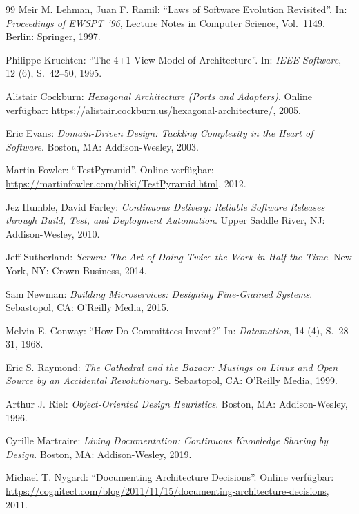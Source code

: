 ﻿\documentclass[a4paper,12pt]{article}
\begin{document}
\begin{thebibliography}{99}
	Meir M. Lehman, Juan F. Ramil:
	\enquote{Laws of Software Evolution Revisited}.
	In: \textit{Proceedings of EWSPT '96}, Lecture Notes in Computer Science,
	Vol.~1149. Berlin: Springer, 1997.
	
	Philippe Kruchten:
	\enquote{The 4+1 View Model of Architecture}.
	In: \textit{IEEE Software}, 12 (6), S.~42--50, 1995.
	
	Alistair Cockburn:
	\textit{Hexagonal Architecture (Ports and Adapters)}.
	Online verfügbar: \url{https://alistair.cockburn.us/hexagonal-architecture/}, 2005.
	
	Eric Evans:
	\textit{Domain-Driven Design: Tackling Complexity in the Heart of Software}.
	Boston, MA: Addison-Wesley, 2003.
	
	Martin Fowler:
	\enquote{TestPyramid}.
	Online verfügbar: \url{https://martinfowler.com/bliki/TestPyramid.html}, 2012.
	
	Jez Humble, David Farley:
	\textit{Continuous Delivery: Reliable Software Releases through Build, Test,
		and Deployment Automation}.
	Upper Saddle River, NJ: Addison-Wesley, 2010.
	
	Jeff Sutherland:
	\textit{Scrum: The Art of Doing Twice the Work in Half the Time}.
	New York, NY: Crown Business, 2014.
	
	Sam Newman:
	\textit{Building Microservices: Designing Fine-Grained Systems}.
	Sebastopol, CA: O'Reilly Media, 2015.
	
	Melvin E. Conway:
	\enquote{How Do Committees Invent?}
	In: \textit{Datamation}, 14 (4), S.~28--31, 1968.
	
	Eric S. Raymond:
	\textit{The Cathedral and the Bazaar: Musings on Linux and Open Source by an
		Accidental Revolutionary}.
	Sebastopol, CA: O'Reilly Media, 1999.
	
	Arthur J. Riel:
	\textit{Object-Oriented Design Heuristics}.
	Boston, MA: Addison-Wesley, 1996.
	
	Cyrille Martraire:
	\textit{Living Documentation: Continuous Knowledge Sharing by Design}.
	Boston, MA: Addison-Wesley, 2019.
	
	Michael T. Nygard:
	\enquote{Documenting Architecture Decisions}.
	Online verfügbar: \url{https://cognitect.com/blog/2011/11/15/documenting-architecture-decisions},
	2011.
	

\end{thebibliography}
\end{document}
